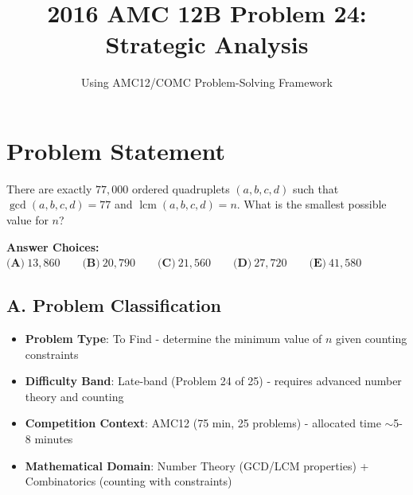 \documentclass[11pt]{article}
\title{\textbf{2016 AMC 12B Problem 24: Strategic Analysis}}
\author{Using AMC12/COMC Problem-Solving Framework}
\date{}
\begin{document}
\maketitle

\section*{Problem Statement}
There are exactly $77,000$ ordered quadruplets $(a, b, c, d)$ such that $\gcd(a, b, c, d) = 77$ and $\operatorname{lcm}(a, b, c, d) = n$. What is the smallest possible value for $n$?

\textbf{Answer Choices:} 
$\textbf{(A)}\ 13,860\qquad\textbf{(B)}\ 20,790\qquad\textbf{(C)}\ 21,560 \qquad\textbf{(D)}\ 27,720 \qquad\textbf{(E)}\ 41,580$

\begin{problemconfigbox}
\subsection*{A. Problem Classification}
\begin{itemize}[leftmargin=*]
    \item \textbf{Problem Type}: To Find - determine the minimum value of $n$ given counting constraints
    \item \textbf{Difficulty Band}: Late-band (Problem 24 of 25) - requires advanced number theory and counting
    \item \textbf{Competition Context}: AMC12 (75 min, 25 problems) - allocated time $\sim$5-8 minutes
    \item \textbf{Mathematical Domain}: Number Theory (GCD/LCM properties) + Combinatorics (counting with constraints)
\end{itemize}


\end{problemconfigbox}
\end{document}
